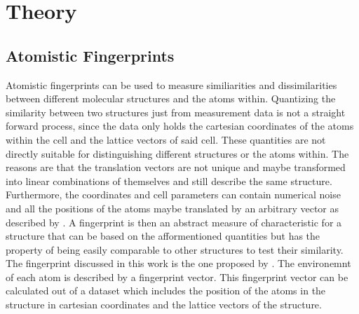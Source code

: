 
\chapter{Theory} %

\label{Chapter1} %


\newcommand{\keyword}[1]{\textbf{#1}}
\newcommand{\tabhead}[1]{\textbf{#1}}
\newcommand{\code}[1]{\texttt{#1}}
\newcommand{\file}[1]{\texttt{\bfseries#1}}
\newcommand{\option}[1]{\texttt{\itshape#1}}


\section{Atomistic Fingerprints}
Atomistic fingerprints can be used to measure similiarities and dissimilarities between different molecular structures and the atoms within. Quantizing the similarity between two structures just from measurement data is not a straight forward process, since the data only holds the cartesian coordinates of the atoms within the cell and the lattice vectors of said cell. These  quantities are not directly suitable for distinguishing different structures or the atoms within. The reasons are that the translation vectors are not unique and maybe transformed into linear combinations of themselves and still describe the same structure. Furthermore, the coordinates and cell parameters can contain numerical noise and all the positions of the atoms maybe translated by an arbitrary vector as described by \citeauthor{Lonie2012} \cite{Lonie2012}. A fingerprint is then an abstract measure of characteristic for a structure that can be based on the afformentioned quantities but has the property of being easily comparable to other structures to test their similarity. The fingerprint discussed in this work is the one proposed by \citeauthor{Zhu2016} \cite{Zhu2016}. The environemnt of each atom is described by a fingerprint vector. This fingerprint vector can be calculated out of a dataset  which includes the position of the atoms in the structure in cartesian coordinates and the lattice vectors of the structure. \\

